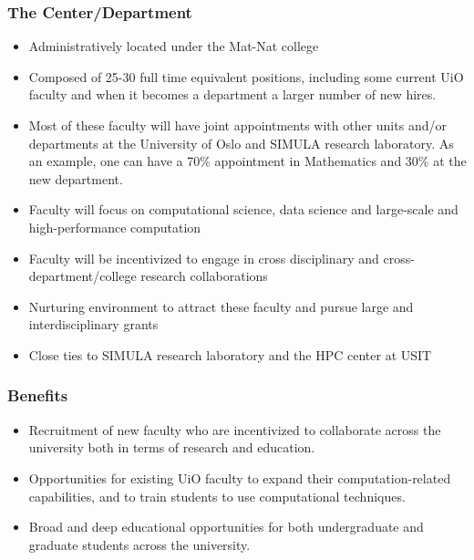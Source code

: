 \documentclass{beamer}
\begin{document}
\begin{frame}
\frametitle{The Center/Department}

\begin{itemize}
\item Administratively located under the Mat-Nat college

\item Composed of 25-30 full time equivalent positions, including some current UiO faculty and when it becomes a department a larger number of new hires.

\item Most of these faculty will have joint appointments with other units and/or departments at the University of Oslo and SIMULA research laboratory. As an example, one can have a 70\% appointment in Mathematics and 30\% at the new department. 

\item Faculty will focus on computational science, data science and large-scale and high-performance computation	

\item Faculty will be incentivized to engage in cross disciplinary and cross-department/college research collaborations	

\item Nurturing environment to attract these faculty and pursue large and interdisciplinary grants	

\item Close ties to SIMULA research laboratory and the HPC center at USIT
\end{itemize}

\noindent
\end{frame}

\begin{frame}
\frametitle{Benefits}

\begin{itemize}
\item Recruitment of new faculty who are incentivized to collaborate across the university both in terms of research and education.

\item Opportunities for existing UiO faculty to expand their computation-related capabilities, and to train students to use computational techniques.	

\item Broad and deep educational opportunities for both undergraduate and graduate students across the university.	
\end{itemize}

\noindent
\end{frame}
\end{document}
